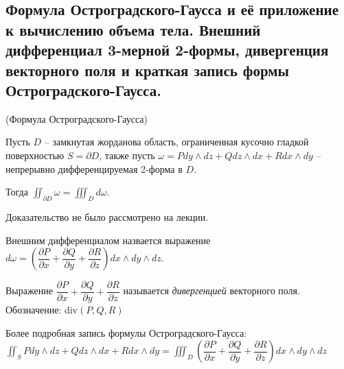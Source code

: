 \subsection{Формула Остроградского-Гаусса и её приложение к вычислению объема тела. Внешний дифференциал 3-мерной 2-формы, дивергенция векторного поля и краткая запись формы Остроградского-Гаусса.}

\begin{theorem*}
    (Формула Остроградского-Гаусса)

    Пусть $D$ -- замкнутая жорданова область, ограниченная кусочно гладкой поверхностью $S = \partial D$, также
    пусть $\omega = P dy \wedge dz + Q dz \wedge dx + R dx \wedge dy$ -- непрерывно дифференцируемая 2-форма в $D$.

    Тогда $\iint_{\partial D} \omega = \iiint_{D} d\omega$.

\end{theorem*}

Доказательство не было рассмотрено на лекции.

\begin{definition*}
    Внешним дифференциалом назвается выражение $d\omega = \left(\dfrac{\partial P}{\partial x} + \dfrac{\partial Q}{\partial y} + \dfrac{\partial R}{\partial z}\right) dx \wedge dy \wedge dz$.
\end{definition*}

\begin{definition*}
    Выражение $\dfrac{\partial P}{\partial x} + \dfrac{\partial Q}{\partial y} + \dfrac{\partial R}{\partial z}$ называется \textit{дивергенцией} векторного поля. Обозначение: div$(P, Q, R)$
\end{definition*}

Более подробная запись формулы Остроградского-Гаусса: $\iint_{S} P dy \wedge dz + Q dz \wedge dx + R dx \wedge dy = \iiint_{D}\left(\dfrac{\partial P}{\partial x} + \dfrac{\partial Q}{\partial y} + \dfrac{\partial R}{\partial z}\right) dx \wedge dy \wedge dz$